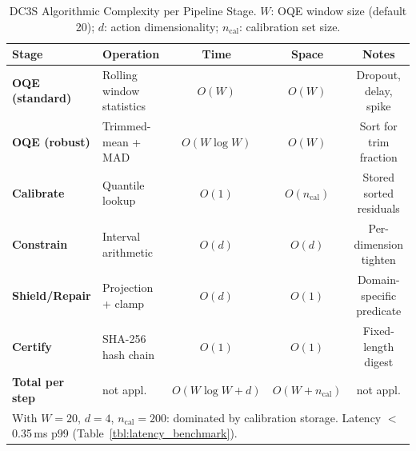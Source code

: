 \begin{table}[htbp]
\centering
\caption{DC3S Algorithmic Complexity per Pipeline Stage.
$W$: OQE window size (default 20); $d$: action dimensionality; $n_\text{cal}$: calibration set size.}
\label{tbl:complexity_analysis}
\begin{tabular}{llccc}
\toprule
\textbf{Stage} & \textbf{Operation} & \textbf{Time} & \textbf{Space} & \textbf{Notes} \\
\midrule
\textbf{OQE (standard)} & Rolling window statistics & $O(W)$ & $O(W)$ & Dropout, delay, spike \\
\textbf{OQE (robust)} & Trimmed-mean + MAD & $O(W \log W)$ & $O(W)$ & Sort for trim fraction \\
\textbf{Calibrate} & Quantile lookup & $O(1)$ & $O(n_\text{cal})$ & Stored sorted residuals \\
\textbf{Constrain} & Interval arithmetic & $O(d)$ & $O(d)$ & Per-dimension tighten \\
\textbf{Shield/Repair} & Projection + clamp & $O(d)$ & $O(1)$ & Domain-specific predicate \\
\textbf{Certify} & SHA-256 hash chain & $O(1)$ & $O(1)$ & Fixed-length digest \\
\midrule
\textbf{Total per step} & not appl. & $O(W \log W + d)$ & $O(W + n_\text{cal})$ & not appl. \\
\bottomrule
\multicolumn{5}{l}{\small With $W{=}20$, $d{=}4$, $n_\text{cal}{=}200$: dominated by calibration storage. Latency $<$0.35\,ms p99 (Table~\ref{tbl:latency_benchmark}).}\\
\end{tabular}
\end{table}
